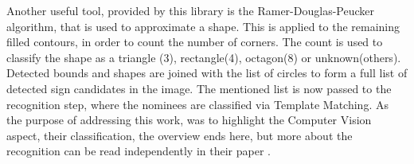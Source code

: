 Another useful tool, provided by this library is the  Ramer-Douglas-Peucker 
algorithm, that is used to approximate a shape.
This is applied to the remaining filled contours, in order to count the number of corners. The count is used
to classify the shape as a triangle (3), rectangle(4), octagon(8) or unknown(others). Detected bounds and  shapes are joined with the list of circles to form a full list of detected sign candidates in the image. The mentioned list is now passed to the recognition step, where the nominees are classified via Template Matching. \newline
As the purpose of addressing this work, was to highlight the Computer Vision aspect, their classification, the overview ends here, but more about the recognition can be read independently in their paper \cite{zynq}. 

